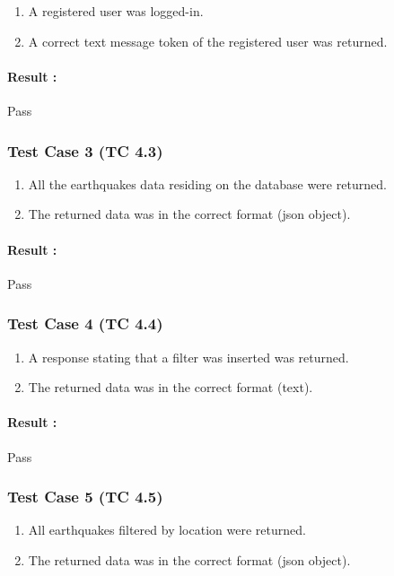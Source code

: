\begin{enumerate}
	\item A registered user was logged-in.
	\item A correct text message token of the registered user was returned.
\end{enumerate}

\paragraph{Result :} Pass

\subsubsection{Test Case 3 (TC 4.3)}

\begin{enumerate}
	\item All the earthquakes data residing on the database were returned. 
	\item The returned data was in the correct format (json object).
\end{enumerate}

\paragraph{Result :} Pass

\subsubsection{Test Case 4 (TC 4.4)}

\begin{enumerate}
	\item A response stating that a filter was inserted was returned.
	\item The returned data was in the correct format (text).
\end{enumerate}

\paragraph{Result :} Pass


\subsubsection{Test Case 5 (TC 4.5)}

\begin{enumerate}
	\item All earthquakes filtered by location were returned.
	\item The returned data was in the correct format (json object).
\end{enumerate}

